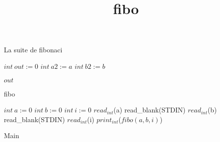\documentclass[8pt]{article}
\title{fibo}
\begin{document}
\maketitle

La suite de fibonaci

\begin{algorithm}[H]
$int\:out := 0$\;
$int\:a2 := a$\;
$int\:b2 := b$\;

\Return $ out $\;
\caption{fibo}
\end{algorithm}

\begin{algorithm}[H]
$int\:a := 0$\;
$int\:b := 0$\;
$int\:i := 0$\;
$read_{int}$(a)\;
read\_blank(STDIN)\;
$read_{int}$(b)\;
read\_blank(STDIN)\;
$read_{int}$(i)\;
$print_{int}$($ fibo(a, b, i) $)\;
\caption{Main}
\end{algorithm}
\end{document}
